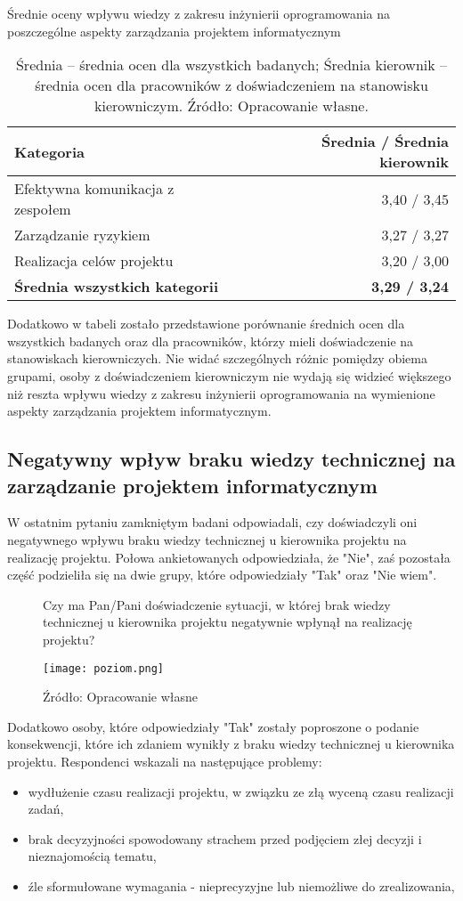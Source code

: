\begin{table}[h]
\centering
\caption{Średnie oceny wpływu wiedzy z zakresu inżynierii oprogramowania na poszczególne aspekty zarządzania projektem informatycznym}
\begin{tabular}{p{8cm} r}
\toprule
\textbf{Kategoria} & \textbf{Średnia / Średnia kierownik} \\
\midrule
Efektywna komunikacja z zespołem & 3{,}40 / 3{,}45 \\
Zarządzanie ryzykiem & 3{,}27 / 3{,}27 \\
Realizacja celów projektu & 3{,}20 / 3{,}00 \\
\textbf{Średnia wszystkich kategorii} & \textbf{3{,}29 / 3{,}24} \\  
\bottomrule
\end{tabular}
\caption*{Średnia – średnia ocen dla wszystkich badanych; Średnia kierownik – średnia ocen dla pracowników z doświadczeniem na stanowisku kierowniczym. Źródło: Opracowanie własne.}
\end{table}

Dodatkowo w tabeli zostało przedstawione porównanie średnich ocen dla wszystkich badanych oraz dla pracowników, którzy mieli doświadczenie na stanowiskach kierowniczych. Nie widać szczególnych różnic pomiędzy obiema grupami, osoby z doświadczeniem kierowniczym nie wydają się widzieć większego niż reszta wpływu wiedzy z zakresu inżynierii oprogramowania na wymienione aspekty zarządzania projektem informatycznym.

\subsection{Negatywny wpływ braku wiedzy technicznej na zarządzanie projektem informatycznym}
W ostatnim pytaniu zamkniętym badani odpowiadali, czy doświadczyli oni negatywnego wpływu braku wiedzy technicznej u kierownika projektu na realizację projektu. Połowa ankietowanych odpowiedziała, że "Nie", zaś pozostała część podzieliła się na dwie grupy, które odpowiedziały "Tak" oraz "Nie wiem".

\begin{figure}
  \caption{Czy ma Pan/Pani doświadczenie sytuacji, w której brak wiedzy technicznej u kierownika projektu negatywnie wpłynął na realizację projektu?}
  \centering
  \texttt{[image: poziom.png]}
  \caption*{Źródło: Opracowanie własne}
\end{figure}

Dodatkowo osoby, które odpowiedziały "Tak" zostały poproszone o podanie konsekwencji, które ich zdaniem wynikły z braku wiedzy technicznej u kierownika projektu. Respondenci wskazali na następujące problemy:
\begin{itemize}
  \item wydłużenie czasu realizacji projektu, w związku ze złą wyceną czasu realizacji zadań,
  \item brak decyzyjności spowodowany strachem przed podjęciem złej decyzji i nieznajomością tematu,
  \item źle sformułowane wymagania - nieprecyzyjne lub niemożliwe do zrealizowania,
\end{itemize}

